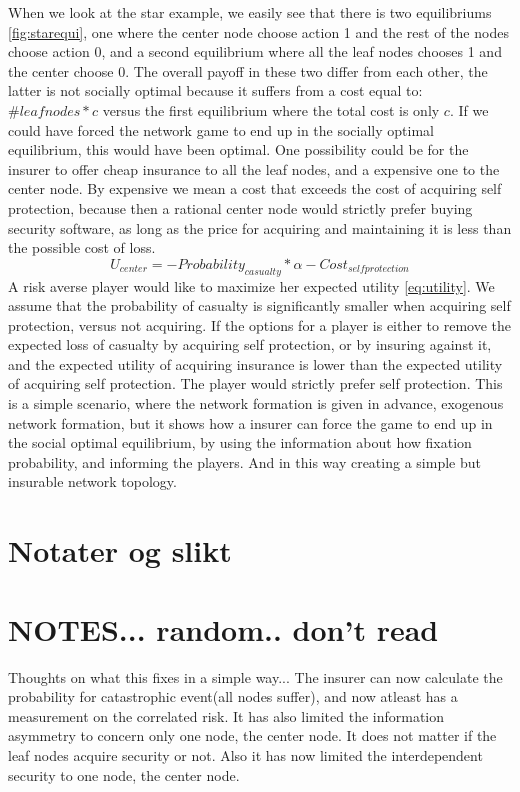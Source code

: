  When we look at the star example, we easily see that there is two equilibriums \ref{fig:starequi}, one where the center node choose action 1 and the rest of the nodes choose action 0, and a second equilibrium where all the leaf nodes chooses 1 and the center choose 0.
The overall payoff in these two differ from each other, the latter is not socially optimal because it
 suffers from a cost equal to: $\#leaf nodes*c$ versus the first equilibrium where the total cost is only $c$.
If we could have forced the network game to end up in the socially optimal equilibrium, this would have been optimal. 
One possibility could be for the insurer to offer cheap insurance to all the leaf nodes, and a expensive one to the center node. By expensive we mean a cost that exceeds the cost of acquiring self protection, because then a rational center node would strictly prefer buying security software, as long as the price for acquiring and maintaining it is less than the possible cost of loss.
\begin{equation}
 U_{center}=-Probability_{casualty}*\alpha-Cost_{selfprotection}
 \label{eq:utility}
 \end{equation} 
A risk averse player would like to maximize her expected utility \ref{eq:utility}. We assume that the probability of casualty is significantly smaller when acquiring self protection, versus not acquiring. If the options for a player is
 either to remove the expected loss of casualty by acquiring self protection, or by insuring against it,
and the expected utility of acquiring insurance is lower than the expected utility of acquiring self protection. The player would strictly prefer self protection. 
This is a simple scenario, where the network formation is given in advance, exogenous network formation, 
but it shows how a insurer can force the game to end up in the social optimal equilibrium, by using the information about how fixation probability, and informing the players. 
And in this way creating a simple but insurable network topology. 

\section{Notater og slikt}

\section{NOTES... random.. don't read}

Thoughts on what this fixes in a simple way...
The insurer can now calculate the probability for catastrophic event(all nodes suffer), and now atleast has a measurement on the correlated risk. It has also limited the information asymmetry to concern only one node, the center node. It does not matter if the leaf nodes acquire security or not. Also it has now limited the interdependent security to one node, the center node.

